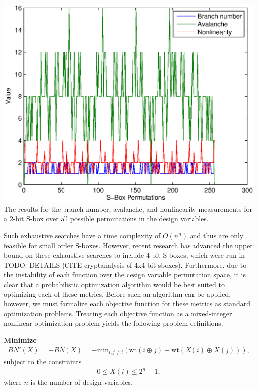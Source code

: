 \documentclass[11pt]{article}
\begin{document}
\begin{center}
	\includegraphics[scale=0.75]{images/brute_joint.eps} \\
	\label{bfjoint}
The results for the branch number, avalanche, and nonlinearity measurements for a $2$-bit S-box over all possible permutations in the design variables. 
\end{center}

Such exhaustive searches have a time complexity of $O(n^n)$ and thus are only feasible for small order S-boxes. However, recent research has advanced the upper bound on these exhaustive searches to include $4$-bit S-boxes, which were run in TODO: DETAILS (CITE cryptanalysis of 4x4 bit sboxes). Furthermore, due to the instability of each function over the design variable permutation space, it is clear that a probabilistic optimization algorithm would be best suited to optimizing each of these metrics. Before such an algorithm can be applied, however, we must formalize each objective function for these metrics as standard optimization problems. Treating each objective function as a mixed-integer nonlinear optimization problem yields the following problem definitions.

\textbf{Minimize}
\begin{eqnarray*}
BN'(X) = -BN(X) = -\text{min}_{i, j\not=i}(\text{wt}(i \oplus j) + \text{wt}(X(i) \oplus X(j))),
\end{eqnarray*}
subject to the constraints
\begin{eqnarray*}
0 \leq X(i) \leq 2^{n} - 1,
\end{eqnarray*}
where $n$ is the number of design variables. \\
\end{document}
